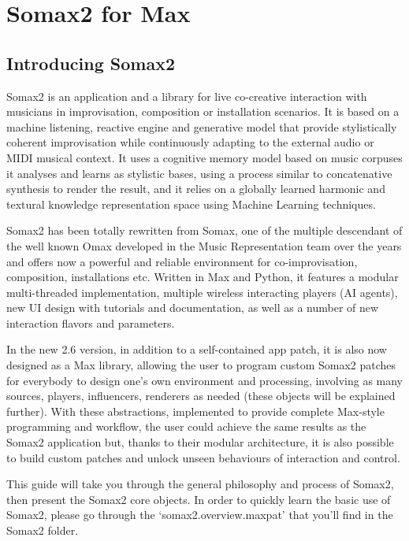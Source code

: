 \chapter{Somax2 for Max}\label{sec:introduction}

\section{Introducing Somax2}

Somax2 is an application and a library for live co-creative interaction with musicians in improvisation, composition or installation scenarios. 
It is based on a machine listening, reactive engine and generative model that provide stylistically coherent improvisation while continuously adapting to the external audio or MIDI musical context. 
It uses a cognitive memory model based on music corpuses it analyses and learns as stylistic bases, using a process similar to concatenative synthesis to render the result, and it relies on a globally learned harmonic and textural knowledge representation space using Machine Learning techniques.

Somax2 has been totally rewritten from Somax, one of the multiple descendant of the well known Omax developed in the Music Representation team over the years and offers now a powerful and reliable environment for co-improvisation, composition, installations etc.
Written in Max and Python, it features a modular multi-threaded implementation, multiple wireless interacting players (AI agents), new UI design with tutorials and documentation, as well as a number of new interaction flavors and parameters.

In the new 2.6 version, in addition to a self-contained app patch, it is also now designed as a Max library, allowing the user to program custom Somax2 patches for everybody to design one's own environment and processing, involving as many sources, players, influencers, renderers as needed (these objects will be explained further). With these abstractions, implemented to provide complete Max-style programming and workflow, the user could achieve the same results as the Somax2 application but, thanks to their modular architecture, it is also possible to build custom patches and unlock unseen behaviours of interaction and control.

This guide will take you through the general philosophy and process of Somax2, then present the Somax2 core objects. In order to quickly learn the basic use of Somax2, please go through the `somax2.overview.maxpat' that you'll find in the Somax2 folder.

